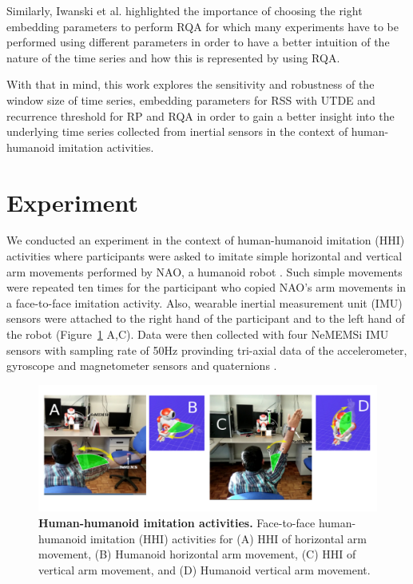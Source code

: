 \documentclass[fleqn,10pt]{wlscirep}
\begin{document}
Similarly, Iwanski et al. \cite{iwanski1998} highlighted the importance 
of choosing the right embedding parameters to perform RQA for which 
many experiments have to be performed using different parameters in order 
to have a better intuition of the nature of the time series and how 
this is represented by using RQA.

With that in mind, this work explores the sensitivity and robustness 
of the window size of time series, embedding parameters for RSS with UTDE 
and recurrence threshold for RP and RQA in order to gain a better insight 
into the underlying time series collected from inertial sensors in the 
context of human-humanoid imitation activities.







\section*{Experiment} \label{sec:experiment}
We conducted an experiment in the context of human-humanoid imitation (HHI) 
activities where participants were asked to imitate simple horizontal and 
vertical arm movements performed by NAO, a humanoid robot \cite{gouaillier2009}.
Such simple movements were repeated ten times for the participant 
who copied NAO's arm movements in a face-to-face imitation activity.
Also, wearable inertial measurement unit (IMU) sensors were attached 
to the right hand of the participant and to the left hand of the robot 
(Figure~\ref{fig:hri} A,C). Data were then collected with four NeMEMSi 
IMU sensors with sampling rate of 50Hz provinding tri-axial data of the 
accelerometer, gyroscope and magnetometer sensors and quaternions 
\cite{Comotti2014}. 
\begin{figure}[ht]
  \centering
\includegraphics[width=1.0\textwidth]{figures/experiment/hri/pdf/hri}
    \caption{
	{\bf Human-humanoid imitation activities.} 
    		Face-to-face human-humanoid imitation (HHI) activities for 
		(A) HHI of horizontal arm movement, 
		(B) Humanoid horizontal arm movement,
		(C) HHI of vertical arm movement, and 
		(D) Humanoid vertical arm movement.
        }
    \label{fig:hri}
\end{figure}
\end{document}
